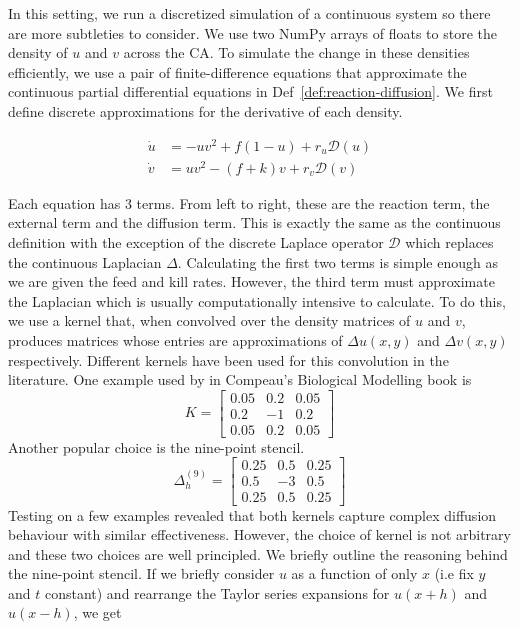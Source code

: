 In this setting, we run a discretized simulation of a continuous system so there are more subtleties to consider. We use two NumPy arrays of floats to store the density of $u$ and $v$ across the CA. To simulate the change in these densities efficiently, we use a pair of finite-difference equations that approximate the continuous partial differential equations in Def~\ref{def:reaction-diffusion}. We first define discrete approximations for the derivative of each density.
\begin{definition}\label{def:gs}
\begin{align*}
  \dot{u} &= -uv^2 + f(1-u) + r_u \mathcal{D}(u)\\
  \dot{v} &= uv^2 - (f+k)v + r_v \mathcal{D}(v)
\end{align*}
\end{definition}
Each equation has 3 terms. From left to right, these are the reaction term, the external term and the diffusion term. This is exactly the same as the continuous definition with the exception of the discrete Laplace operator $\mathcal{D}$ which replaces the continuous Laplacian $\Delta$. Calculating the first two terms is simple enough as we are given the feed and kill rates.  However, the third term must approximate the Laplacian which is usually computationally intensive to calculate. To do this, we use a kernel that, when convolved over the density matrices of $u$ and $v$, produces matrices whose entries are approximations of $\Delta u(x,y)$ and $\Delta v(x,y)$ respectively. Different kernels have been used for this convolution in the literature. One example used by in Compeau's Biological Modelling book\cite{compeau} is
\[
  K= \begin{bmatrix}
    0.05 & 0.2 & 0.05\\
    0.2 & -1 & 0.2\\
    0.05 & 0.2 & 0.05
  \end{bmatrix}
\]
Another popular choice is the nine-point stencil\cite{rosser1975nine}.
\[
  \Delta^{(9)}_h = \begin{bmatrix}
    0.25 & 0.5 & 0.25\\
    0.5 & -3 & 0.5\\
    0.25 & 0.5 & 0.25
  \end{bmatrix}
\]
Testing on a few examples revealed that both kernels capture complex diffusion behaviour with similar effectiveness. However, the choice of kernel is not arbitrary and these two choices are well principled. We briefly outline the reasoning behind the nine-point stencil. If we briefly consider $u$ as a function of only $x$ (i.e fix $y$ and $t$ constant) and rearrange the Taylor series expansions for $u(x+h)$ and $u(x-h)$, we get
